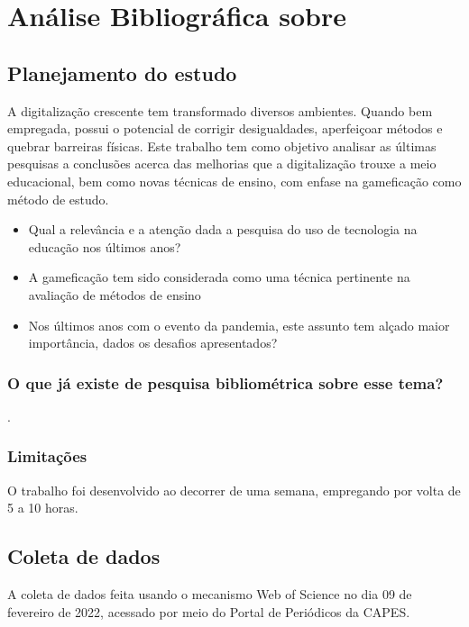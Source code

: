 \chapter{Análise Bibliográfica sobre \label{chap:bibliometria:}}

\section{Planejamento do estudo\label{}}

  A digitalização crescente tem transformado diversos ambientes. Quando bem empregada, possui o potencial de corrigir desigualdades, aperfeiçoar métodos e quebrar barreiras físicas. Este trabalho tem como objetivo analisar as últimas pesquisas a conclusões acerca das melhorias que a digitalização trouxe a meio educacional, bem como novas técnicas de ensino, com enfase na gameficação como método de estudo.
 

\begin{itemize}
    \item Qual a relevância e a atenção dada a pesquisa do uso de tecnologia na educação nos últimos anos?
    \item A gameficação tem sido considerada como uma técnica pertinente na avaliação de métodos de ensino
    \item Nos últimos anos com o evento da pandemia, este assunto tem alçado maior importância, dados os desafios apresentados?
\end{itemize}

\subsection{O que já existe de pesquisa bibliométrica sobre esse tema?}

\cite{} 
\cite{}.


\subsection{Limitações} O trabalho foi desenvolvido ao decorrer de uma semana, empregando por volta de 5 a 10 horas.

\section{Coleta de dados\label{MASSA:coleta}}

A coleta de dados feita usando o mecanismo Web of Science no dia 09 de fevereiro de 2022, acessado por meio do Portal de Periódicos da CAPES.


